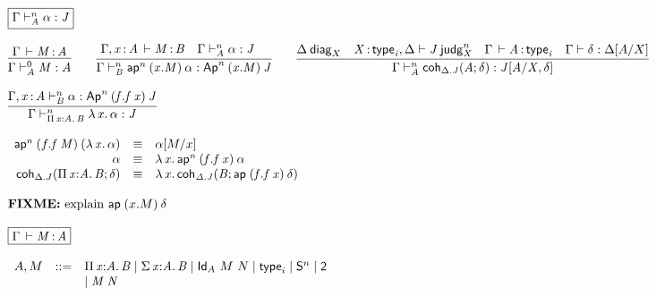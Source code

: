 \begin{small}
\[\begin{array}{l}
\\ \\

\framebox{\ofjudg{\Gamma}{n}{A}{\alpha}{J}} \\ \\

\infer{\ofjudg{\Gamma}{0}{A}{M}{A}} 
      {\oftp{\Gamma}{M}{A}}
\qquad
\infer{\ofjudg{\Gamma}{n}{B}{\apn{n}{(x.M)}{\alpha}}{\Apn{n}{(x.M)}{J}}}
      {\oftp{\Gamma,\tptm{x}{A}}{M}{B} &
       \ofjudg{\Gamma}{n}{A}{\alpha}{J} &
      }
\qquad
\infer{\ofjudg{\Gamma}{n}{A}{\coh{\ctx{\Delta}.J}{A}{\delta}}{\tsubst{J}{A/X,\delta}}}
      {\wfdiag{\Delta}{X} &
       \wfjudg{\tptm{X}{\typ{i}},\Delta}{J}{n}{X} &
       \oftp{\Gamma}{A}{\typ{i}} &
       \wfdsubst{\Gamma}{\delta}{\tsubst{\ctx \Delta}{A/X}}
      }
\\ \\
\infer{\ofjudg{\Gamma}{n}{\picl{x}{A}{B}}{\ulam{x}{\alpha}}{J}}
      {\ofjudg{\Gamma,\tptm{x}{A}}{n}{B}{\alpha}{\Apn{n}{(f.\app{f}{x})}{J}}}

\\ \\

\begin{array}{rcl}
\apn{n}{(f.\app f M)}{(\ulam{x}{\alpha})} & \equiv & \tsubst{\alpha}{M/x} \\
\alpha & \equiv & \ulam{x}{\apn{n}{(f.\app f x)}{\alpha}} \\
\coh{\Delta.J}{\picl{x}{A}{B}}{\delta} & \equiv & \ulam{x}{\coh{\Delta.J}{B}{\apn{}{(f.\app f x)}{\delta}}}
\end{array}
\\ \\

\text{\FIXME{explain \apn{}{(x.M)}{\delta}}}

\\ \\

\framebox{\oftp{\Gamma}{M}{A}} \\ \\

\begin{array}{rcl}
A,M & ::= & \picl{x}{A}{B} \mid \sigmacl{x}{A}{B} \mid \idtp{A}{M}{N} \mid
\typ{i} \mid
\dsd{S}^n \mid \dsd{2} \\ 
& & \mid \app M N
\end{array}



\end{array}
\]
\end{small}
